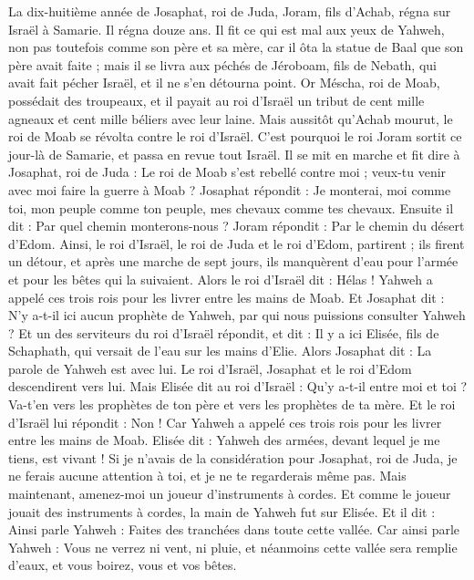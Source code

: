 \begin{multicols}{2}
\VerseOne{}La dix-huitième année de Josaphat, roi de Juda, Joram, fils d’Achab, régna sur Israël à Samarie. Il régna douze ans.
Il fit ce qui est mal aux yeux de Yahweh, non pas toutefois comme son père et sa mère, car il ôta la statue de Baal que son père avait faite ;
mais il se livra aux péchés de Jéroboam, fils de Nebath, qui avait fait pécher Israël, et il ne s’en détourna point.
Or Méscha, roi de Moab, possédait des troupeaux, et il payait au roi d’Israël un tribut de cent mille agneaux et cent mille béliers avec leur laine.
Mais aussitôt qu’Achab mourut, le roi de Moab se révolta contre le roi d’Israël.
C’est pourquoi le roi Joram sortit ce jour-là de Samarie, et passa en revue tout Israël.
Il se mit en marche et fit dire à Josaphat, roi de Juda : Le roi de Moab s’est rebellé contre moi ; veux-tu venir avec moi faire la guerre à Moab ? Josaphat répondit : Je monterai, moi comme toi, mon peuple comme ton peuple, mes chevaux comme tes chevaux.
Ensuite il dit : Par quel chemin monterons-nous ? Joram répondit : Par le chemin du désert d’Edom.
Ainsi, le roi d’Israël, le roi de Juda et le roi d’Edom, partirent ; ils firent un détour, et après une marche de sept jours, ils manquèrent d’eau pour l’armée et pour les bêtes qui la suivaient.
Alors le roi d’Israël dit : Hélas ! Yahweh a appelé ces trois rois pour les livrer entre les mains de Moab.
Et Josaphat dit : N’y a-t-il ici aucun prophète de Yahweh, par qui nous puissions consulter Yahweh ? Et un des serviteurs du roi d’Israël répondit, et dit : Il y a ici Elisée, fils de Schaphath, qui versait de l’eau sur les mains d’Elie.
Alors Josaphat dit : La parole de Yahweh est avec lui. Le roi d’Israël, Josaphat et le roi d’Edom descendirent vers lui.
Mais Elisée dit au roi d’Israël : Qu’y a-t-il entre moi et toi ? Va-t’en vers les prophètes de ton père et vers les prophètes de ta mère. Et le roi d’Israël lui répondit : Non ! Car Yahweh a appelé ces trois rois pour les livrer entre les mains de Moab.
Elisée dit : Yahweh des armées, devant lequel je me tiens, est vivant ! Si je n’avais de la considération pour Josaphat, roi de Juda, je ne ferais aucune attention à toi, et je ne te regarderais même pas.
Mais maintenant, amenez-moi un joueur d’instruments à cordes. Et comme le joueur jouait des instruments à cordes, la main de Yahweh fut sur Elisée.
Et il dit : Ainsi parle Yahweh : Faites des tranchées dans toute cette vallée.
Car ainsi parle Yahweh : Vous ne verrez ni vent, ni pluie, et néanmoins cette vallée sera remplie d’eaux, et vous boirez, vous et vos bêtes.

\end{multicols}
